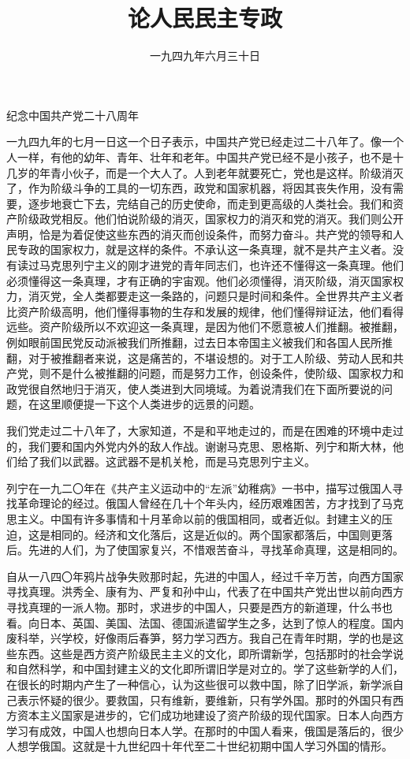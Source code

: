 
\title{论人民民主专政}
\date{一九四九年六月三十日}
\maketitle


纪念中国共产党二十八周年

一九四九年的七月一日这一个日子表示，中国共产党已经走过二十八年了。像一个人一样，有他的幼年、青年、壮年和老年。中国共产党已经不是小孩子，也不是十几岁的年青小伙子，而是一个大人了。人到老年就要死亡，党也是这样。阶级消灭了，作为阶级斗争的工具的一切东西，政党和国家机器，将因其丧失作用，没有需要，逐步地衰亡下去，完结自己的历史使命，而走到更高级的人类社会。我们和资产阶级政党相反。他们怕说阶级的消灭，国家权力的消灭和党的消灭。我们则公开声明，恰是为着促使这些东西的消灭而创设条件，而努力奋斗。共产党的领导和人民专政的国家权力，就是这样的条件。不承认这一条真理，就不是共产主义者。没有读过马克思列宁主义的刚才进党的青年同志们，也许还不懂得这一条真理。他们必须懂得这一条真理，才有正确的宇宙观。他们必须懂得，消灭阶级，消灭国家权力，消灭党，全人类都要走这一条路的，问题只是时间和条件。全世界共产主义者比资产阶级高明，他们懂得事物的生存和发展的规律，他们懂得辩证法，他们看得远些。资产阶级所以不欢迎这一条真理，是因为他们不愿意被人们推翻。被推翻，例如眼前国民党反动派被我们所推翻，过去日本帝国主义被我们和各国人民所推翻，对于被推翻者来说，这是痛苦的，不堪设想的。对于工人阶级、劳动人民和共产党，则不是什么被推翻的问题，而是努力工作，创设条件，使阶级、国家权力和政党很自然地归于消灭，使人类进到大同境域。为着说清我们在下面所要说的问题，在这里顺便提一下这个人类进步的远景的问题。

我们党走过二十八年了，大家知道，不是和平地走过的，而是在困难的环境中走过的，我们要和国内外党内外的敌人作战。谢谢马克思、恩格斯、列宁和斯大林，他们给了我们以武器。这武器不是机关枪，而是马克思列宁主义。

列宁在一九二〇年在《共产主义运动中的“左派”幼稚病》一书中，描写过俄国人寻找革命理论的经过。俄国人曾经在几十个年头内，经历艰难困苦，方才找到了马克思主义。中国有许多事情和十月革命以前的俄国相同，或者近似。封建主义的压迫，这是相同的。经济和文化落后，这是近似的。两个国家都落后，中国则更落后。先进的人们，为了使国家复兴，不惜艰苦奋斗，寻找革命真理，这是相同的。

自从一八四〇年鸦片战争失败那时起，先进的中国人，经过千辛万苦，向西方国家寻找真理。洪秀全、康有为、严复和孙中山，代表了在中国共产党出世以前向西方寻找真理的一派人物。那时，求进步的中国人，只要是西方的新道理，什么书也看。向日本、英国、美国、法国、德国派遣留学生之多，达到了惊人的程度。国内废科举，兴学校，好像雨后春笋，努力学习西方。我自己在青年时期，学的也是这些东西。这些是西方资产阶级民主主义的文化，即所谓新学，包括那时的社会学说和自然科学，和中国封建主义的文化即所谓旧学是对立的。学了这些新学的人们，在很长的时期内产生了一种信心，认为这些很可以救中国，除了旧学派，新学派自己表示怀疑的很少。要救国，只有维新，要维新，只有学外国。那时的外国只有西方资本主义国家是进步的，它们成功地建设了资产阶级的现代国家。日本人向西方学习有成效，中国人也想向日本人学。在那时的中国人看来，俄国是落后的，很少人想学俄国。这就是十九世纪四十年代至二十世纪初期中国人学习外国的情形。

